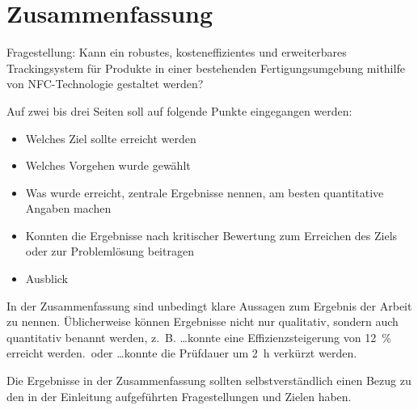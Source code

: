 \chapter{Zusammenfassung}
\label{cha:zusammenfassung}

Fragestellung:
Kann ein robustes, kosteneffizientes und erweiterbares Trackingsystem für Produkte in einer bestehenden Fertigungsumgebung mithilfe von NFC-Technologie gestaltet werden?

Auf zwei bis drei Seiten soll auf folgende Punkte eingegangen werden:

\begin{itemize}
	\item Welches Ziel sollte erreicht werden
	\item Welches Vorgehen wurde gewählt
	\item Was wurde erreicht, zentrale Ergebnisse nennen, am besten quantitative Angaben machen
	\item Konnten die Ergebnisse nach kritischer Bewertung zum Erreichen des Ziels oder zur Problemlösung beitragen
	\item  Ausblick
\end{itemize}

In der Zusammenfassung sind unbedingt klare Aussagen zum Ergebnis der Arbeit zu nennen. Üblicherweise können Ergebnisse nicht nur qualitativ, sondern auch quantitativ benannt werden, z.~B. \glqq \ldots konnte eine Effizienzsteigerung von \SI{12}{\percent} erreicht werden.\grqq~oder \glqq \ldots konnte die Prüfdauer um \SI{2}{\hour} verkürzt werden\grqq.

Die Ergebnisse in der Zusammenfassung sollten selbstverständlich einen Bezug zu den in der Einleitung aufgeführten Fragestellungen und Zielen haben.
